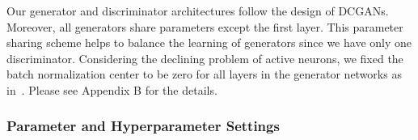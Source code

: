 \documentclass{article}
\begin{document}
Our generator and discriminator architectures follow the design of DCGANs.
Moreover, all generators share parameters except the first layer.
This parameter sharing scheme helps to balance the learning of generators since we have only one discriminator.
Considering the declining problem of active neurons, we fixed the batch normalization center to be zero for all layers in the generator networks as in~\cite{hoang2018mgan}.
Please see Appendix B for the details.
\begin{table*}[h]
\caption{Inception scores on different datasets.}
\label{Tab:IS}
\centering
{}
\end{table*}

\subsubsection{Parameter and Hyperparameter Settings}
\label{sec:Para}
\end{document}
